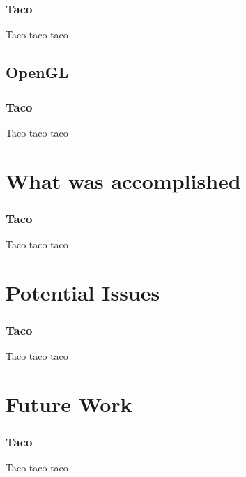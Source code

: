 \documentclass[english]{beamer}
\begin{document}
\begin{frame}
  \frametitle{Taco}
  Taco taco taco
\end{frame}

\subsection{OpenGL}

\begin{frame}
  \frametitle{Taco}
  Taco taco taco
\end{frame}

\section{What was accomplished}

\begin{frame}
  \frametitle{Taco}
  Taco taco taco
\end{frame}

\section{Potential Issues}

\begin{frame}
  \frametitle{Taco}
  Taco taco taco
\end{frame}

\section{Future Work}

\begin{frame}
  \frametitle{Taco}
  Taco taco taco
\end{frame}
\end{document}
